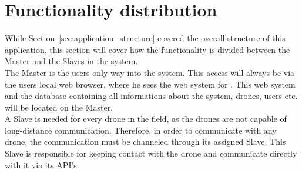 \section{Functionality distribution}

While Section~\ref{sec:application_structure} covered the overall structure of this application, this section will cover how the functionality is divided between the Master and the Slaves in the system. \\

The Master is the users only way into the system. 
This access will always be via the users local web browser, where he sees the web system for \projectname{}.
This web system and the database containing all informations about the system, drones, users etc. will be located on the Master. \\

A Slave is needed for every drone in the field, as the drones are not capable of long-distance communication. 
Therefore, in order to communicate with any drone, the communication must be channeled through its assigned Slave. 
This Slave is responsible for keeping contact with the drone and communicate directly with it via its API's. 


